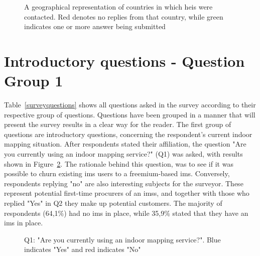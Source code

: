 \newpage
\begin{figure}[]
    \centering
    \caption{A geographical representation of countries in which \glspl{hei} were contacted. Red denotes no replies from that country, while green indicates one or more answer being submitted}
    \label{fig:worldmap}
\end{figure}

\section{Introductory questions - Question Group 1}
Table~\ref{surveyquestions} shows all questions asked in the survey according to their respective group of questions. Questions have been grouped in a manner that will present the survey results in a clear way for the reader. The first group of questions are introductory questions, concerning the respondent's current indoor mapping situation. After respondents stated their affiliation, the question "Are you currently using an indoor mapping service?" (Q1) was asked, with results shown in Figure~\ref{fig:q1}. The rationale behind this question, was to see if it was possible to churn existing \gls{ims} users to a freemium-based \gls{ims}. Conversely, respondents replying "no" are also interesting subjects for the surveyor. These represent potential first-time procurers of an \glspl{ims}, and together with those who replied "Yes" in Q2 they make up potential customers. The majority of respondents (64,1\%) had no \gls{ims} in place, while 35,9\% stated that they have an \gls{ims} in place. 

\begin{figure}[H]
    \centering
    \caption{Q1: "Are you currently using an indoor mapping service?". Blue indicates "Yes" and red indicates "No"}
    \label{fig:q1}
\end{figure}


